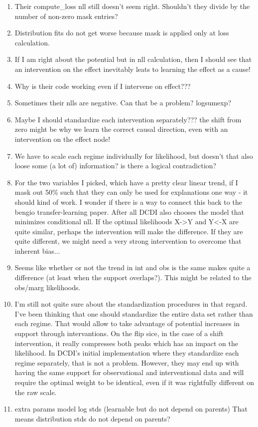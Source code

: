 \documentclass{article}
\begin{document}
\begin{enumerate}
    \item Their compute\_loss nll still doesn't seem right. Shouldn't they divide by the number of non-zero mask entries?
    \item Distribution fits do not get worse because mask is applied only at loss calculation.
    \item If I am right about the potential but in nll calculation, then I should see that an intervention on the effect inevitably leats to learning the effect as a cause!
    \item Why is their code working even if I intervene on effect???
    \item Sometimes their nlls are negative. Can that be a problem? logsumexp?
    \item Maybe I should standardize each intervention separately??? the shift from zero might be why we learn the correct causal direction, even with an intervention on the effect node!
    \item We have to scale each regime individually for likelihood, but doesn't that also loose some (a lot of) information? is there a logical contradiction?
    \item For the two variables I picked, which have a pretty clear linear trend, if I mask out 50\% such that they can only be used for explanations one way - it should kind of work. I wonder if  there is a way to connect this back to the bengio transfer-learning paper. After all DCDI also chooses the model that minimizes conditional nll. If the optimal likelihoods X->Y and Y<-X are quite similar, perhaps the intervention will make the difference. If they are quite different, we might need a very strong intervention to overcome that inherent bias...
    \item Seems like whether or not the trend in int and obs is the same makes quite a difference (at least when the support overlaps?). This might be related to the obs/marg likelihoods.
    \item I'm still not quite sure about the standardization procedures in that regard. I've been thinking that one should standardize the entire data set rather than each regime. That would allow to take advantage of potential increases in support through intervantions. On the flip sice, in the case of a shift intervention, it really compresses both peaks which has an impact on the likelihood.
    In DCDI's initial implementation where they standardize each regime separately, that is not a problem. However, they may end up with having the same support for observational and interventional data and will require the optimal weight to be identical, even if it was rightfully different on the raw scale.
    \item extra params model log stds (learnable but do not depend on parents) That means distribution stds do not depend on parents?
\end{enumerate}
\end{document}
